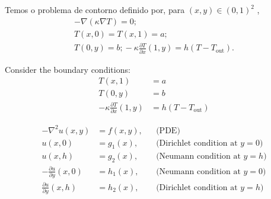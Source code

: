 \documentclass{article}
\begin{document}
	
	Temos o problema de contorno definido por, para $ (x, y) \in (0, 1)^2 $ , \\
	\begin{gather}
		-\nabla(\kappa\nabla T) = 0 \texttt{;} \\
		T(x, 0) = T(x, 1) = a \texttt{;} \\
		T(0, y) = b \texttt{;} \, -\kappa \frac{\partial T}{\partial x}(1, y) = h(T - T_{\text{out}})\texttt{.}
	\end{gather}

	
	Consider the boundary conditions:
	\begin{align*}
		T(x, 1) &= a \\
		T(0, y) &= b \\
		-\kappa \frac{\partial T}{\partial x}(1, y) &= h(T - T_{\text{out}})
	\end{align*}
	

	
	
	\begin{align*}
		-\nabla^2 u(x, y) &= f(x, y), && \text{(PDE)}\\
		u(x, 0) &= g_1(x), && \text{(Dirichlet condition at }y=0)\\
		u(x, h) &= g_2(x), && \text{(Neumann condition at }y=h)\\
		-\frac{\partial u}{\partial y}(x, 0) &= h_1(x), && \text{(Neumann condition at }y=0)\\
		\frac{\partial u}{\partial y}(x, h) &= h_2(x), && \text{(Dirichlet condition at }y=h)
	\end{align*}
	
\end{document}
